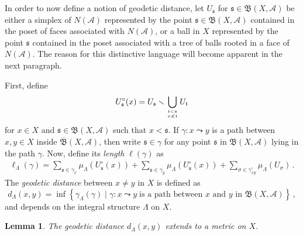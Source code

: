 \documentclass[a4paper,draft]{ZbRad}
\theoremstyle{plain}
\newtheorem{lem}{Lemma}[section]
\theoremstyle{definition}
\numberwithin{equation}{section}
\renewcommand{\setminus}{\smallsetminus}
\newcommand{\mathset}[1]{{\left\{#1\right\}}}
\begin{document}
In order to now define a notion of geodetic distance, let
$U_{\mathfrak{s}}$ for $\mathfrak{s}\in\mathfrak{B}(X,\mathcal{A})$ be either a simplex of $N(\mathcal{A})$ represented by the point $\mathfrak{s}\in\mathfrak{B}(X,\mathcal{A})$ contained in the poset of faces associated with $N(\mathcal{A})$, or
a ball in $X$ represented by the point $\mathfrak{s}$ contained in the poset associated with a tree of balls rooted in a face of $N(\mathcal{A})$. The reason for this distinctive language will become apparent in the next paragraph.
\newline

First, define
\[
U_{\mathfrak{s}}^\circ(x)=U_{\mathfrak{s}}\setminus\bigcup\limits_{\mathfrak{t}<\mathfrak{s}\atop x\not<\mathfrak{t}}U_{\mathfrak{t}}
\]
for $x\in X$ and $\mathfrak{s}\in\mathfrak{B}(X,\mathcal{A})$ such that $x<\mathfrak{s}$. If $\gamma\colon x\leadsto y$ is a path between $x,y\in X$ inside $\overline{\mathfrak{B}}(X,\mathcal{A})$, then write $\mathfrak{s}\in\gamma$ for any point $\mathfrak{s}$ in $\mathfrak{B}(X,\mathcal{A})$ lying in the path $\gamma$.
Now, define its \emph{length} $\ell(\gamma)$ as
\begin{align}\label{pathlength}
\ell_\Lambda(\gamma)=\sum\limits_{\mathfrak{s}\in\gamma_x}\mu_\Lambda(U_{\mathfrak{s}}^\circ(x))+\sum\limits_{\mathfrak{s}\in\gamma_y}\mu_\Lambda(U_{\mathfrak{s}}^\circ(x))
+\sum\limits_{\sigma\in\gamma_{xy}^\circ}\mu_\Lambda(U_\sigma)\,.
\end{align}
The \emph{geodetic distance} between $x\neq y$ in $X$ is defined as
\[
d_\Lambda(x,y)=\inf\mathset{\gamma_\Lambda(\gamma)\mid\gamma\colon x\leadsto y\;\text{is a path between $x$ and $y$ in $\mathfrak{B}(X,\mathcal{A})$}}\,,
\]
and depends on the integral structure $\Lambda$ on $X$.

\begin{lem}
The geodetic distance $d_\Lambda(x,y)$ extends to a metric on $X$.
\end{lem}
\end{document}
